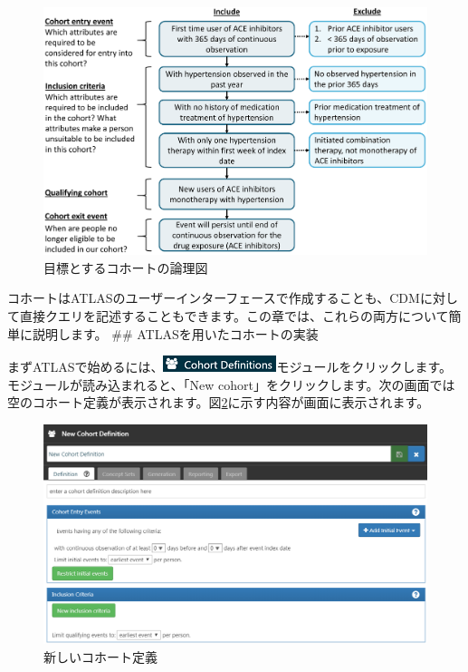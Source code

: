 \documentclass[
  11pt]{book}
\theoremstyle{definition}
\theoremstyle{definition}
\theoremstyle{definition}
\theoremstyle{definition}
\theoremstyle{remark}
\begin{document}
\begin{figure}

{\centering \includegraphics[width=1\linewidth]{images/Cohorts/CohortPractice} 

}

\caption{目標とするコホートの論理図}\label{fig:CohortPractice}
\end{figure}

コホートはATLASのユーザーインターフェースで作成することも、CDMに対して直接クエリを記述することもできます。この章では、これらの両方について簡単に説明します。
\#\# ATLASを用いたコホートの実装

まずATLASで始めるには、\includegraphics{images/Cohorts/cohortdefinition.png}モジュールをクリックします。モジュールが読み込まれると、「New cohort」をクリックします。次の画面では空のコホート定義が表示されます。図\ref{fig:ATLASdefineacohort}に示す内容が画面に表示されます。

\begin{figure}

{\centering \includegraphics[width=1\linewidth]{images/Cohorts/ATLAS-defineacohort} 

}

\caption{新しいコホート定義}\label{fig:ATLASdefineacohort}
\end{figure}
\end{document}
